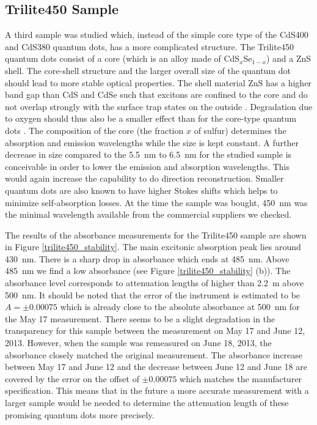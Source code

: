 \documentclass[cits]{JINST}
\begin{document}
\subsection{Trilite450 Sample}
A third sample was studied which, instead of the simple core type of the CdS400 and CdS380 quantum dots, has a more complicated structure. The Trilite450 quantum dots consist of a core (which is an alloy made of CdS$_x$Se$_{1-x}$) and a ZnS shell. The core-shell structure and the larger overall size of the quantum dot should lead to more stable optical properties. The shell material ZnS has a higher band gap than CdS and CdSe such that excitons are confined to the core and do not overlap strongly with the surface trap states on the outside \cite{dabbousi1997}. Degradation due to oxygen should thus also be a smaller effect than for the core-type quantum dots \cite{vanSark}. The composition of the core (the fraction $x$ of sulfur) determines the absorption and emission wavelengths while the size is kept constant. A further decrease in size compared to the 5.5~nm to 6.5~nm for the studied sample is conceivable in order to lower the emission and absorption wavelengths. This would again increase the capability to do direction reconstruction. Smaller quantum dots are also known to have higher Stokes shifts \cite{swafford2006,capek,kuno1997} which helps to minimize self-absorption losses. At the time the sample was bought, 450~nm was the minimal wavelength available from the commercial suppliers we checked.

The results of the absorbance measurements for the Trilite450 sample are shown in Figure \ref{trilite450_stability}. The main excitonic absorption peak lies around 430~nm. There is a sharp drop in absorbance which ends at 485~nm. Above 485~nm we find a low absorbance (see Figure \ref{trilite450_stability} (b)). The absorbance level corresponds to attenuation lengths of higher than 2.2~m above 500~nm. It should be noted that the error of the instrument is estimated to be $A = \pm 0.00075$ which is already close to the absolute absorbance at 500~nm for the May 17 measurement. There seems to be a slight degradation in the transparency for this sample between the measurement on May 17 and June 12, 2013. However, when the sample was remeasured on June 18, 2013, the absorbance closely matched the original measurement. The absorbance increase between May 17 and June 12 and the decrease between June 12 and June 18 are covered by the error on the offset of $\pm 0.00075$ which matches the manufacturer specification. This means that in the future a more accurate measurement with a larger sample would be needed to determine the attenuation length of these promising quantum dots more precisely.
    
\end{document}
